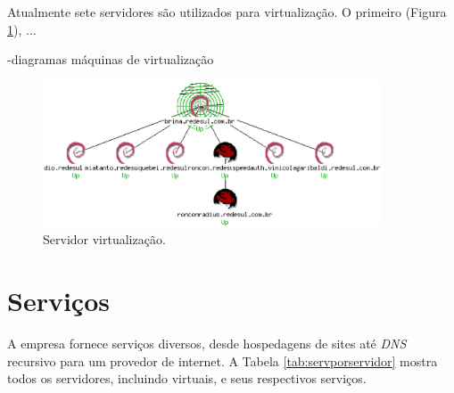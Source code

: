 Atualmente sete servidores são utilizados para virtualização. O primeiro (Figura \ref{fig:servlog_1}), ...

-diagramas máquinas de virtualização

\begin{figure}[servlog_1]
 \centering
 \includegraphics[width=380px]{img/servlog_1.eps}
 \caption{Servidor virtualização.}
 \label{fig:servlog_1}
\end{figure}

\section{Serviços}
\label{section:serv}

A empresa fornece serviços diversos, desde hospedagens de sites até \textit{DNS} recursivo para um provedor de internet.
A Tabela \ref{tab:servporservidor} mostra todos os servidores, incluindo virtuais, e seus respectivos serviços.

